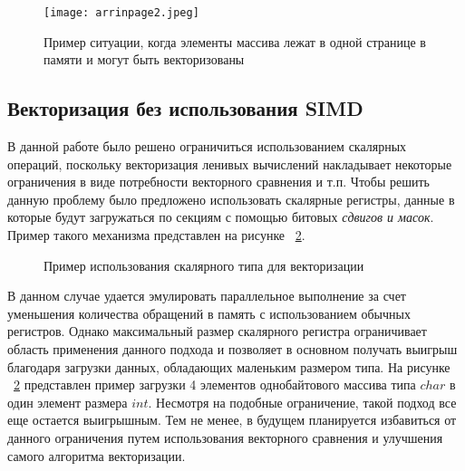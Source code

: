 \begin{figure}[!htb]
    \centering
    \texttt{[image: arrinpage2.jpeg]}
    \caption{Пример ситуации, когда элементы массива лежат в одной странице в памяти и могут быть векторизованы}
    \label{arr2}
\end{figure}

\subsection{Векторизация без использования SIMD}

В данной работе было решено ограничиться использованием скалярных операций, поскольку векторизация ленивых вычислений накладывает некоторые ограничения в виде потребности векторного сравнения и т.п. Чтобы решить данную проблему было предложено использовать скалярные регистры, данные в которые будут загружаться по секциям с помощью битовых \textit{сдвигов и масок}. Пример такого механизма представлен на рисунке ~\ref{charint}.

\begin{figure}[!htb]
    \centering
    
    \caption{Пример использования скалярного типа для векторизации}
    \label{charint}
\end{figure}

В данном случае удается эмулировать параллельное выполнение за счет уменьшения количества обращений в память с использованием обычных регистров. Однако максимальный размер скалярного регистра ограничивает область применения данного подхода и позволяет в основном получать выигрыш благодаря загрузки данных, обладающих маленьким размером типа. На рисунке ~\ref{charint} представлен пример загрузки 4 элементов однобайтового массива типа $char$ в один элемент размера $int$. Несмотря на подобные ограничение, такой подход все еще остается выигрышным. Тем не менее, в будущем планируется избавиться от данного ограничения путем использования векторного сравнения и улучшения самого алгоритма векторизации.  
\newpage
